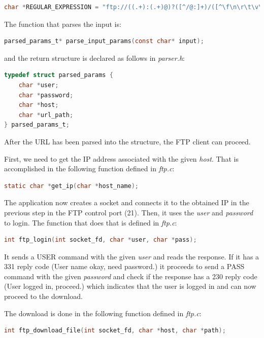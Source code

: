 \documentclass[a4paper,11pt,english]{article}
\begin{document}
\begin{lstlisting}[language=C]
char *REGULAR_EXPRESSION = "ftp://((.+):(.+)@)?([^/@:]+)/([^\f\n\r\t\v\x20]*)";
\end{lstlisting}
        
        \noindent The function that parses the input is:
\begin{lstlisting}[language=C]
parsed_params_t* parse_input_params(const char* input);
\end{lstlisting}

        \noindent and the return structure is declared as follows in \textit{parser.h}:
\begin{lstlisting}[language=C]
typedef struct parsed_params {
    char *user;
    char *password;
    char *host;
    char *url_path;
} parsed_params_t;
\end{lstlisting}

        \noindent After the URL has been parsed into the structure, the FTP client can proceed.

        First, we need to get the IP address associated with the given \textit{host}. That is accomplished
        in the following function defined in \textit{ftp.c}:
\begin{lstlisting}[language=C]
static char *get_ip(char *host_name);
\end{lstlisting}   

        \noindent The application now creates a socket and connects it to the obtained IP in the previous step in
        the FTP control port (21). Then, it uses the \textit{user} and \textit{password} to login. The function
        that does that is defined in \textit{ftp.c}:
\begin{lstlisting}[language=C]
int ftp_login(int socket_fd, char *user, char *pass);
\end{lstlisting}

        \noindent It sends a USER command with the given \textit{user} and reads the response. If it has
        a 331 reply code (User name okay, need password.) it proceeds to send a PASS command with the
        given \textit{password} and check if the response has a 230 reply code (User logged in, proceed.)
        which indicates that the user is logged in and can now proceed to the download.

        The download is done in the following function defined in \textit{ftp.c}:
\begin{lstlisting}[language=C]
int ftp_download_file(int socket_fd, char *host, char *path);
\end{lstlisting}
\end{document}
